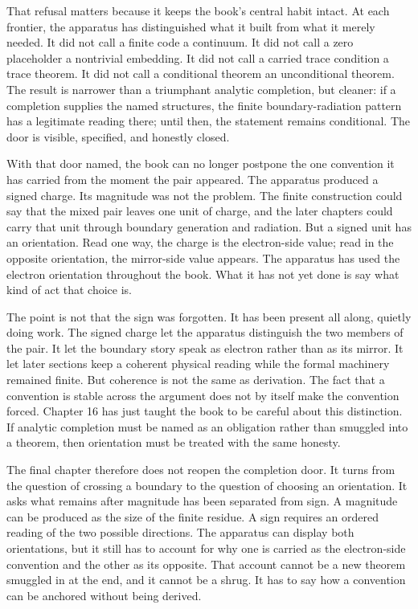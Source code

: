 That refusal matters because it keeps the book's central habit intact. At each
frontier, the apparatus has distinguished what it built from what it merely
needed. It did not call a finite code a continuum. It did not call a zero
placeholder a nontrivial embedding. It did not call a carried trace condition a
trace theorem. It did not call a conditional theorem an unconditional theorem.
The result is narrower than a triumphant analytic completion, but cleaner: if a
completion supplies the named structures, the finite boundary-radiation pattern
has a legitimate reading there; until then, the statement remains conditional.
The door is visible, specified, and honestly closed.

With that door named, the book can no longer postpone the one convention it has
carried from the moment the pair appeared. The apparatus produced a signed
charge. Its magnitude was not the problem. The finite construction could say
that the mixed pair leaves one unit of charge, and the later chapters could
carry that unit through boundary generation and radiation. But a signed unit
has an orientation. Read one way, the charge is the electron-side value; read in
the opposite orientation, the mirror-side value appears. The apparatus has used
the electron orientation throughout the book. What it has not yet done is say
what kind of act that choice is.

The point is not that the sign was forgotten. It has been present all along,
quietly doing work. The signed charge let the apparatus distinguish the two
members of the pair. It let the boundary story speak as electron rather than as
its mirror. It let later sections keep a coherent physical reading while the
formal machinery remained finite. But coherence is not the same as derivation.
The fact that a convention is stable across the argument does not by itself
make the convention forced. Chapter 16 has just taught the book to be careful
about this distinction. If analytic completion must be named as an obligation
rather than smuggled into a theorem, then orientation must be treated with the
same honesty.

The final chapter therefore does not reopen the completion door. It turns from
the question of crossing a boundary to the question of choosing an orientation.
It asks what remains after magnitude has been separated from sign. A magnitude
can be produced as the size of the finite residue. A sign requires an ordered
reading of the two possible directions. The apparatus can display both
orientations, but it still has to account for why one is carried as the
electron-side convention and the other as its opposite. That account cannot be a
new theorem smuggled in at the end, and it cannot be a shrug. It has to say how
a convention can be anchored without being derived.

